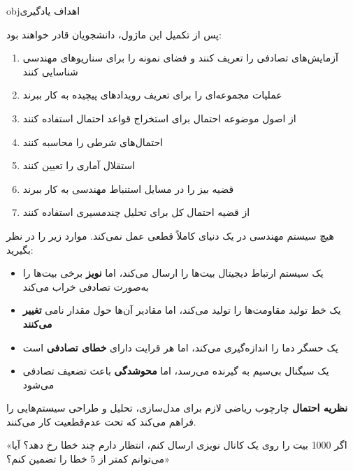 \begin{PSbox}[unbreakable]{obj}{اهداف یادگیری}

پس از تکمیل این ماژول، دانشجویان قادر خواهند بود:

\begin{enumerate}
\def\labelenumi{\arabic{enumi}.}
\tightlist
\item
  آزمایش‌های تصادفی را تعریف کنند و فضای نمونه را برای سناریوهای مهندسی شناسایی کنند
\item
  عملیات مجموعه‌ای را برای تعریف رویدادهای پیچیده به کار ببرند
\item
  از اصول موضوعه احتمال برای استخراج قواعد احتمال استفاده کنند
\item
  احتمال‌های شرطی را محاسبه کنند
\item
  استقلال آماری را تعیین کنند
\item
  قضیه بیز را در مسایل استنباط مهندسی به کار ببرند
\item
  از قضیه احتمال کل برای تحلیل چندمسیری استفاده کنند
\end{enumerate}

\end{PSbox}



هیچ سیستم مهندسی در یک دنیای کاملاً قطعی عمل نمی‌کند. موارد زیر را در نظر بگیرید:

\begin{itemize}
\tightlist
\item
  یک سیستم ارتباط دیجیتال بیت‌ها را ارسال می‌کند، اما \textbf{نویز} برخی بیت‌ها را به‌صورت تصادفی خراب می‌کند
\item
  یک خط تولید مقاومت‌ها را تولید می‌کند، اما مقادیر آن‌ها حول مقدار نامی \textbf{تغییر می‌کنند}
\item
  یک حسگر دما را اندازه‌گیری می‌کند، اما هر قرایت دارای \textbf{خطای تصادفی} است
\item
  یک سیگنال بی‌سیم به گیرنده می‌رسد، اما \textbf{محو‌شدگی} باعث تضعیف تصادفی می‌شود
\end{itemize}

\textbf{نظریه احتمال} چارچوب ریاضی لازم برای مدل‌سازی، تحلیل و طراحی سیستم‌هایی را فراهم می‌کند که تحت عدم‌قطعیت کار می‌کنند.


\begin{PSquote}

«اگر 1000 بیت را روی یک کانال نویزی ارسال کنم، انتظار دارم چند خطا رخ دهد؟ آیا می‌توانم کمتر از 5 خطا را تضمین کنم؟»

\end{PSquote}

